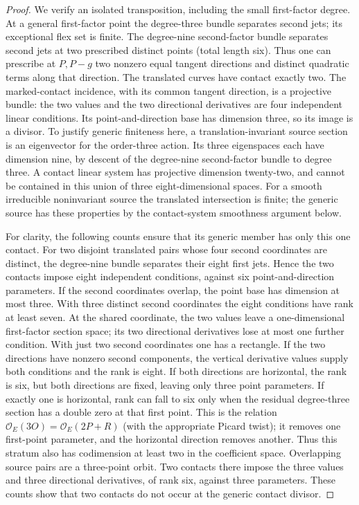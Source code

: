 \begin{proof}
We verify an isolated transposition, including the small
first-factor degree. At a general first-factor point the
degree-three bundle separates second jets; its exceptional
flex set is finite. The degree-nine second-factor bundle
separates second jets at two prescribed distinct points
(total length six). Thus one can prescribe at $P,P-g$
two nonzero equal tangent directions and distinct quadratic
terms along that direction. The translated curves have
contact exactly two. The marked-contact incidence, with its
common tangent direction, is a projective bundle: the two
values and the two directional derivatives are four
independent linear conditions. Its point-and-direction base
has dimension three, so its image is a divisor. To justify
generic finiteness here, a translation-invariant source section
is an eigenvector for the order-three action. Its three
eigenspaces each have dimension nine, by descent of the
degree-nine second-factor bundle to degree three. A contact
linear system has projective dimension twenty-two, and cannot
be contained in this union of three eight-dimensional spaces.
For a smooth irreducible noninvariant source the translated
intersection is finite; the generic source has these properties
by the contact-system smoothness argument below.

For clarity, the following counts ensure that its generic
member has only this one contact. For two disjoint translated
pairs whose four second coordinates are distinct, the
degree-nine bundle separates their eight first jets. Hence
the two contacts impose eight independent conditions, against
six point-and-direction parameters. If the second coordinates
overlap, the point base has dimension at most three. With three
distinct second coordinates the eight conditions have rank
at least seven. At the shared coordinate, the two values
leave a one-dimensional first-factor section space; its two
directional derivatives lose at most one further condition.
With just two second coordinates one has a rectangle. If the
two directions have nonzero second components, the vertical
derivative values supply both conditions and the rank is eight.
If both directions are horizontal, the rank is six, but both
directions are fixed, leaving only three point parameters.
If exactly one is horizontal, rank can fall to six only when
the residual degree-three section has a double zero at that
first point. This is the relation
$\mathcal O_E(3O)=\mathcal O_E(2P+R)$ (with the appropriate
Picard twist); it removes one first-point parameter, and the
horizontal direction removes another. Thus this stratum also
has codimension at least two in the coefficient space.
Overlapping source pairs are a three-point orbit. Two contacts
there impose the three values and three directional derivatives,
of rank six, against three parameters. These counts show that
two contacts do not occur at the generic contact divisor.


\end{proof}
